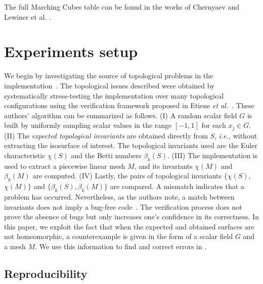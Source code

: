 The full Marching Cubes table can be found in the works of Chernyaev \cite{Chernyaev95marchingcubes} and Lewiner et al. \cite{Lewiner:2003}.

\section{Experiments setup}
\label{experiments_setup}

We begin by investigating the source of topological problems in the \mc{} implementation~\cite{Etiene:2012:TVI:2197070.2197097}.
%
The topological issues described were obtained by systematically stress-testing the implementation over many topological configurations using the verification framework proposed in Etiene \emph{et al.}~\cite{Etiene:2012:TVI:2197070.2197097}. These authors' algorithm can be summarized as follows.
%
(I) A random scalar field $G$ is built by uniformly sampling scalar values in the range $[-1,1]$ for each $x_j \in G$.
%
(II) The \emph{expected topological invariants} are obtained directly from $S$, {\em i.e.}, without extracting the isosurface of interest. The topological invariants used are the Euler characteristic $\chi(S)$ and the Betti numbers $\beta_k(S)$. 
%
(III) The \mc{} implementation is used to extract a piecewise linear mesh $M$, and its invariants $\chi(M)$ and $\beta_k(M)$ are computed.
%
(IV) Lastly, the pairs of topological invariants $\{\chi(S)$, $\chi(M)\}$ and $\{\beta_k(S), \beta_k(M)\}$ are compared. A mismatch indicates that a problem has occurred. Nevertheless,  as the authors note, a match between invariants does not imply a bug-free code~\cite{Etiene:2012:TVI:2197070.2197097}. The verification process does not prove the absence of bugs but only increases one's confidence in its correctness.
%
In this paper, we exploit the fact that when the expected and obtained surfaces are not homeomorphic, a counterexample is given in the form of a scalar field $G$ and a mesh $M$. We use this information to find and correct errors in \mc{}.

\subsection{Reproducibility}

